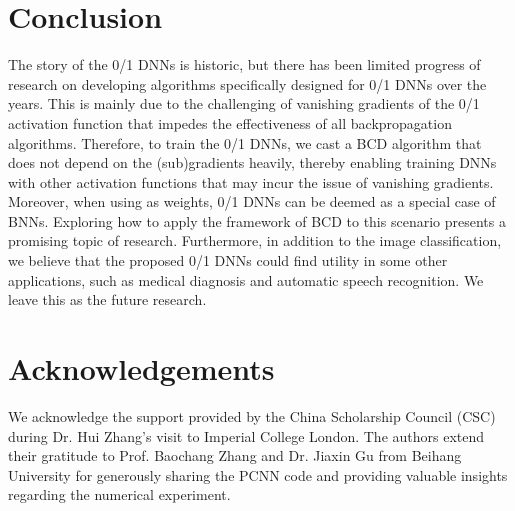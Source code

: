\documentclass[journal]{IEEEtran}
\begin{document}
\section{Conclusion} \label{Section-conclusion}
The story of the 0/1 DNNs is historic, but there has been limited progress of research on developing algorithms specifically designed for 0/1 DNNs over the years. This is mainly due to the challenging of vanishing gradients of the 0/1 activation function that impedes the effectiveness of all backpropagation algorithms. Therefore, to train the 0/1 DNNs, we  cast a BCD algorithm that does not depend on the (sub)gradients heavily, thereby enabling training DNNs with other activation functions that may incur the issue of vanishing  gradients. {
Moreover, when using  as weights, 0/1 DNNs can be deemed as a special case of BNNs. Exploring how to apply the framework of BCD to this scenario presents a promising topic of research.  Furthermore, in addition to the  image classification, we believe that the proposed 0/1 DNNs  could find utility in some other applications, such as medical diagnosis and automatic speech recognition. We leave this as the future research.}

\section*{Acknowledgements}
We acknowledge the support provided by the China Scholarship Council (CSC) during Dr. Hui Zhang's visit to Imperial College London. The authors extend their gratitude to Prof. Baochang Zhang and Dr. Jiaxin Gu from Beihang University for generously sharing the PCNN code and providing valuable insights regarding the numerical experiment.
\end{document}
